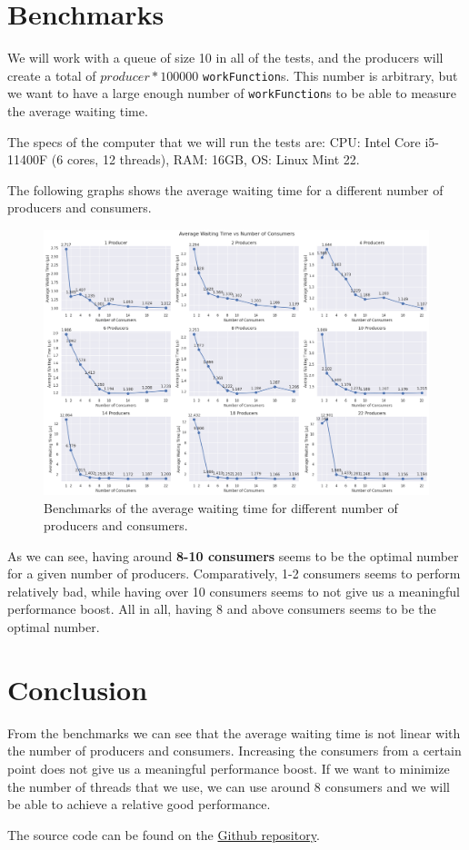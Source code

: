 \documentclass{article}
\begin{document}
\section{Benchmarks}
We will work with a queue of size 10 in all of the tests, and the producers will create a total of
$ producer * 100000 $ \texttt{workFunction}s. This number is arbitrary, but we want to have a
large enough number of \texttt{workFunction}s to be able to measure the average waiting time.

The specs of the computer that we will run the tests are: CPU: Intel Core i5-11400F (6 cores, 12 threads), RAM: 16GB, OS: Linux Mint 22.

The following graphs shows the average waiting time for a different number of producers and consumers.

\begin{figure}[H]
    \centering
    \includegraphics[width=1\textwidth]{benchmarks.png}
    \caption{Benchmarks of the average waiting time for different number of producers and consumers.}
    \label{alg:benchmarks}
\end{figure}

As we can see, having around \textbf{8-10 consumers} seems to be the optimal number for a given number of producers.
Comparatively, 1-2 consumers seems to perform relatively bad, while having over 10 consumers seems to not give us
a meaningful performance boost. All in all, having 8 and above consumers seems to be the optimal number.

\section{Conclusion}

From the benchmarks we can see that the average waiting time is not linear with the number of producers and consumers.
Increasing the consumers from a certain point does not give us a meaningful performance boost.
If we want to minimize the number of threads that we use, we can use around 8 consumers and we will be able to
achieve a relative good performance.

The source code can be found on the \href{https://github.com/NontasBak/producer-consumer}{Github repository}.
\end{document}
